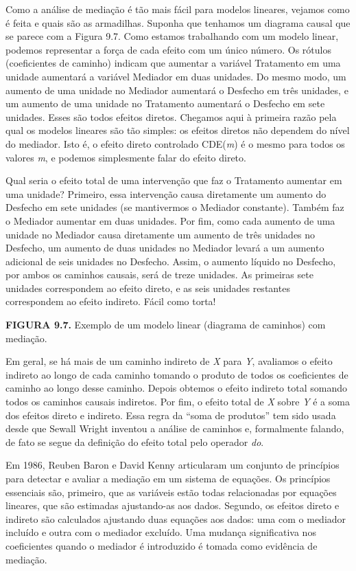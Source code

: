 \documentclass[11pt,a5paper,twoside]{book}
\begin{document}
Como a análise de mediação é tão mais fácil para modelos lineares, vejamos como é feita e quais são as armadilhas. Suponha que tenhamos um diagrama causal que se parece com a Figura 9.7. Como estamos trabalhando com um modelo linear, podemos representar a força de cada efeito com um único número. Os rótulos (coeficientes de caminho) indicam que aumentar a variável Tratamento em uma unidade aumentará a variável Mediador em duas unidades. Do mesmo modo, um aumento de uma unidade no Mediador aumentará o Desfecho em três unidades, e um aumento de uma unidade no Tratamento aumentará o Desfecho em sete unidades. Esses são todos efeitos diretos. Chegamos aqui à primeira razão pela qual os modelos lineares são tão simples: os efeitos diretos não dependem do nível do mediador. Isto é, o efeito direto controlado CDE(\textit{m}) é o mesmo para todos os valores \textit{m}, e podemos simplesmente falar do efeito direto.

Qual seria o efeito total de uma intervenção que faz o Tratamento aumentar em uma unidade? Primeiro, essa intervenção causa diretamente um aumento do Desfecho em sete unidades (se mantivermos o Mediador constante). Também faz o Mediador aumentar em duas unidades. Por fim, como cada aumento de uma unidade no Mediador causa diretamente um aumento de três unidades no Desfecho, um aumento de duas unidades no Mediador levará a um aumento adicional de seis unidades no Desfecho. Assim, o aumento líquido no Desfecho, por ambos os caminhos causais, será de treze unidades. As primeiras sete unidades correspondem ao efeito direto, e as seis unidades restantes correspondem ao efeito indireto. Fácil como torta!

\textbf{FIGURA 9.7.} Exemplo de um modelo linear (diagrama de caminhos) com mediação.

Em geral, se há mais de um caminho indireto de \textit{X} para \textit{Y}, avaliamos o efeito indireto ao longo de cada caminho tomando o produto de todos os coeficientes de caminho ao longo desse caminho. Depois obtemos o efeito indireto total somando todos os caminhos causais indiretos. Por fim, o efeito total de \textit{X} sobre \textit{Y} é a soma dos efeitos direto e indireto. Essa regra da “soma de produtos” tem sido usada desde que Sewall Wright inventou a análise de caminhos e, formalmente falando, de fato se segue da definição do efeito total pelo operador \textit{do}.

Em 1986, Reuben Baron e David Kenny articularam um conjunto de princípios para detectar e avaliar a mediação em um sistema de equações. Os princípios essenciais são, primeiro, que as variáveis estão todas relacionadas por equações lineares, que são estimadas ajustando-as aos dados. Segundo, os efeitos direto e indireto são calculados ajustando duas equações aos dados: uma com o mediador incluído e outra com o mediador excluído. Uma mudança significativa nos coeficientes quando o mediador é introduzido é tomada como evidência de mediação.
\end{document}
